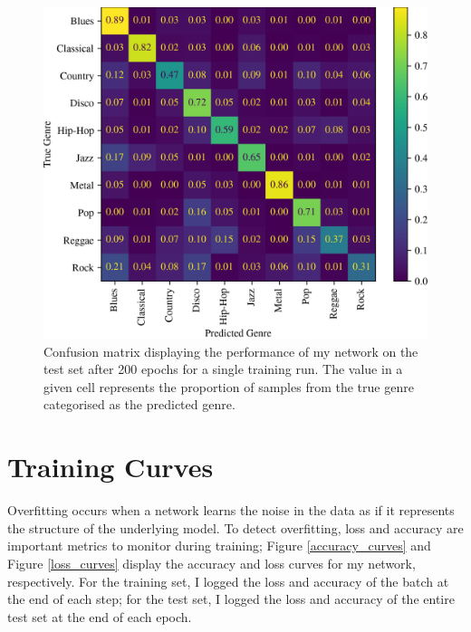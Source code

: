 \documentclass[conference]{IEEEtran}
\begin{document}
\begin{figure}[htbp]
    \centerline{\includegraphics[width=\columnwidth]{cm.png}}
    \caption{
        Confusion matrix displaying the performance of my network on the test set after 200 epochs for a single training run.    
        The value in a given cell represents the proportion of samples from the true genre categorised as the predicted genre.
    }
    \label{confusion_matrix}
\end{figure}

\section{Training Curves}

Overfitting occurs when a network learns the noise in the data as if it represents the structure of the underlying model.
To detect overfitting, loss and accuracy are important metrics to monitor during training; Figure \ref{accuracy_curves} and Figure \ref{loss_curves} display the accuracy and loss curves for my network, respectively.
For the training set, I logged the loss and accuracy of the batch at the end of each step; for the test set, I logged the loss and accuracy of the entire test set at the end of each epoch.
\end{document}
